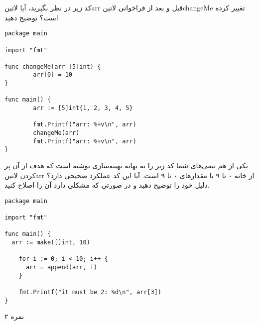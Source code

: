 \documentclass[../main.tex]{subfiles}
\begin{document}

کد زیر در نظر بگیرید، آیا ‌لاتین{arr} قبل و بعد از فراخوانی ‌لاتین{changeMe} تغییر کرده است؟ توضیح دهید.

\begin{latin}
\begin{verbatim}
package main

import "fmt"

func changeMe(arr [5]int) {
        arr[0] = 10
}

func main() {
        arr := [5]int{1, 2, 3, 4, 5}

        fmt.Printf("arr: %+v\n", arr)
        changeMe(arr)
        fmt.Printf("arr: %+v\n", arr)
}
\end{verbatim}
\end{latin}

یکی از هم تیمی‌های شما کد زیر را به بهانه بهینه‌سازی نوشته است که هدف
از آن پر کردن ‌لاتین{arr} از خانه ۰ تا ۹ با مقدارهای ۰ تا ۹ است.
آیا این کد عملکرد صحیحی دارد؟ دلیل خود را توضیح دهید و در صورتی
که مشکلی دارد آن را اصلاح کنید.

\begin{latin}
\begin{verbatim}
package main

import "fmt"

func main() {
  arr := make([]int, 10)

    for i := 0; i < 10; i++ {
      arr = append(arr, i)
    }

    fmt.Printf("it must be 2: %d\n", arr[3])
}

\end{verbatim}
\end{latin}

۲ نمره
\end{document}
